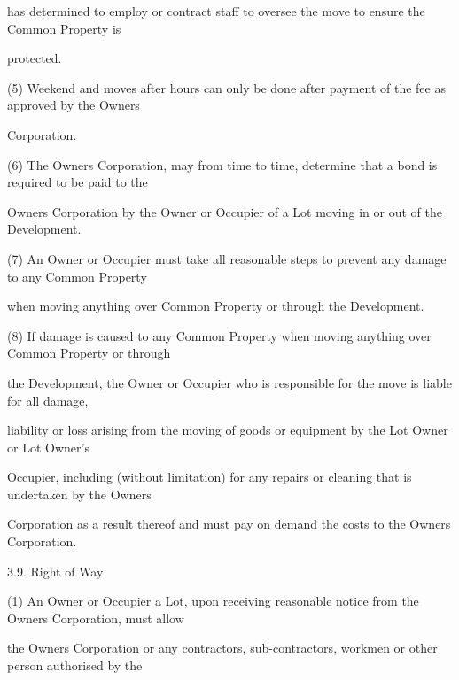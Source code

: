 \documentclass{article}
\begin{document}
{\fontsize{10.02}{1}has determined to employ or contract staff to oversee the move to ensure the Common Property is }

{\fontsize{10.02}{1}protected. }

{\fontsize{9.962}{1}(5) Weekend and moves after hours can only be done after payment of the fee as approved by the Owners }

{\fontsize{10.02}{1}Corporation. }

{\fontsize{9.962}{1}(6) The Owners Corporation, may from time to time, determine that a bond is required to be paid to the }

{\fontsize{10.02}{1}Owners Corporation by the Owner or Occupier of a Lot moving in or out of the Development. }

{\fontsize{9.962}{1}(7) An Owner or Occupier must take all reasonable steps to prevent any damage to any Common Property }

{\fontsize{10.02}{1}when moving anything over Common Property or through the Development. }

{\fontsize{9.962}{1}(8) If damage is caused to any Common Property when moving anything over Common Property or through }

{\fontsize{10.02}{1}the Development, the Owner or Occupier who is responsible for the move is liable for all damage, }

{\fontsize{10.02}{1}liability or loss arising from the moving of goods or equipment by the Lot Owner or Lot Owner’s }

{\fontsize{10.02}{1}Occupier, including (without limitation) for any repairs or cleaning that is undertaken by the Owners }

{\fontsize{10.02}{1}Corporation as a result thereof and must pay on demand the costs to the Owners Corporation. }

\newpage



















{\fontsize{9.99}{1}3.9. Right of Way }

{\fontsize{9.962}{1}(1) An Owner or Occupier a Lot, upon receiving reasonable notice from the Owners Corporation, must allow }

{\fontsize{10.02}{1}the Owners Corporation or any contractors, sub-contractors, workmen or other person authorised by the }
\end{document}
